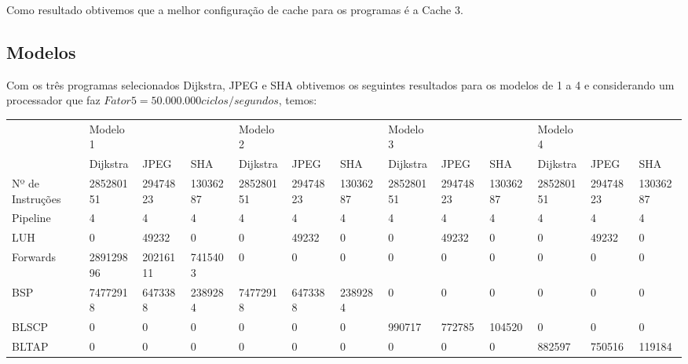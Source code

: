 \documentclass[pdftex,12pt,a4paper]{article}
\begin{document}
Como resultado obtivemos que a melhor configuração de cache para os programas é a Cache 3.

\subsection{Modelos}

Com os três programas selecionados Dijkstra, JPEG e SHA obtivemos os seguintes resultados 
para os modelos de 1 a 4 e considerando um processador que faz $Fator5 = 50.000.000 ciclos/segundos$, 
temos:

\begin{table}[H]
\resizebox{17cm}{!} {
\begin{tabular}{l|lll|lll|lll|lll|}
                        & Modelo 1  &           &          & Modelo 2  &           &          & Modelo 3  &           &          & Modelo 4  &          &          \\
                        & Dijkstra  & JPEG      & SHA      & Dijkstra  & JPEG      & SHA      & Dijkstra  & JPEG      & SHA      & Dijkstra  & JPEG      & SHA      \\ \hline
Nº de Instruções        & 285280151 & 29474823  & 13036287 & 285280151 & 29474823  & 13036287 & 285280151 & 29474823  & 13036287 & 285280151 & 29474823  & 13036287 \\
Pipeline                & 4         & 4         & 4        & 4         & 4         & 4        & 4         & 4         & 4        & 4         & 4         & 4        \\
LUH                     & 0         & 49232     & 0        & 0         & 49232     & 0        & 0         & 49232     & 0        & 0         & 49232     & 0        \\
Forwards                & 289129896 & 20216111  & 7415403  & 0         & 0         & 0        & 0         & 0         & 0        & 0         & 0         & 0        \\
BSP                     & 74772918  & 6473388   & 2389284  & 74772918  & 6473388   & 2389284  & 0         & 0         & 0        & 0         & 0         & 0        \\
BLSCP                   & 0         & 0         & 0        & 0         & 0         & 0        & 990717    & 772785    & 104520   & 0         & 0         & 0        \\
BLTAP                   & 0         & 0         & 0        & 0         & 0         & 0        & 0         & 0         & 0        & 882597    & 750516    & 119184   \\

\end{tabular}}
\end{table}
\end{document}
